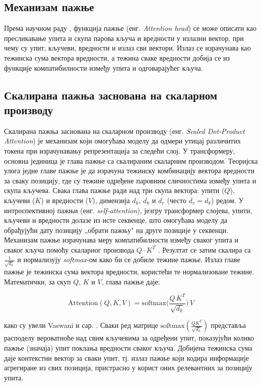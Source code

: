 \subsection{Механизам пажње}

Према научном раду \cite{vaswani_attention_2017}, функција пажње (енг. \textit{Attention head}) се може описати као пресликавање упита и скупа парова кључа и вредности у излазни вектор, при чему су упит, кључеви, вредности и излаз сви вектори. Излаз се израчунава као тежинска сума вектора вредности, а тежина сваке вредности добија се из функције компатибилности између упита и одговарајућег кључа.

\subsection{Скалирана пажња заснована на скаларном производу}

Скалирана пажња заснована на скаларном производу (енг. \textit{Scaled Dot-Product Attention}) је механизам који омогућава моделу да одмери утицај различитих токена при израчунавању репрезентација за следећи слој. У трансформеру, основна јединица је глава пажње са скалираним скаларним производом. Теоријска улога једне главе пажње је да израчуна тежинску комбинацију вектора вредности за сваку позицију, где су тежине одређене паровним сличностима између упита и скупа кључева. Свака глава пажње ради над три скупа вектора: упити ($Q$), кључеви ($K$) и вредности ($V$), димензија $d_k$, $d_k$ и $d_v$ (често $d_v = d_k$) редом. У интроспективној пажњи (енг. \textit{self-attention}), језгру трансформер слојева, упити, кључеви и вредности долазе из исте секвенце, што омогућава моделу да обрађујући дату позицију „обрати пажњу" на друге позиције у секвенци. Механизам пажње израчунава меру компатибилности између сваког упита и сваког кључа помоћу скаларног производа $Q \cdot K^T$ \cite{vaswani_attention_2017}. Резултат се затим скалира са $\frac{1}{\sqrt{d_k}}$ и нормализују \textit{softmax}-ом како би се добиле тежине пажње. Излаз главе пажње је тежинска сума вектора вредности, користећи те нормализоване тежине. Математички, за скуп $Q$, $K$ и $V$, глава пажње даје:

\begin{equation}
\text{Attention}(Q, K, V) = \text{softmax}\!\Big( \frac{Q\,K^T}{\sqrt{d_k}}\Big)\,V
\label{eq:attention}
\end{equation}

како су увели Vaswani и сар. \cite{vaswani_attention_2017}. Сваки ред матрице $\text{softmax}(\frac{QK^T}{\sqrt{d_k}})$ представља расподелу вероватноће над свим кључевима за одређени упит, показујући колико пажње (значаја) упит поклања вредности сваког кључа. Добијена тежинска сума даје контекстни вектор за сваки упит, тј. излаз пажње који кодира информације агрегиране из свих позиција, пристрасно у корист оних релевантних за позицију упита.

